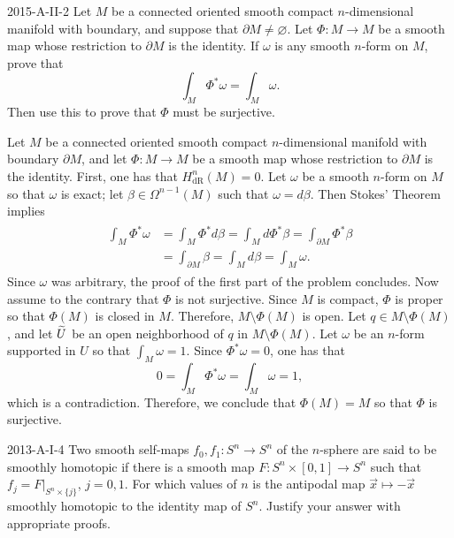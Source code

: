 \documentclass{article}
\begin{document}
	\begin{prb}{2015-A-II-2}
		Let $M$ be a connected oriented smooth compact $n$-dimensional manifold with boundary, and suppose that $\partial M \neq \varnothing$. Let $\Phi: M \to M$ be a smooth map whose restriction to $\partial M$ is the identity. If $\omega$ is any smooth $n$-form on $M$, prove that 
		\begin{equation*}
			\int_{M}\Phi^{\ast}\omega = \int_{M}\omega. 
		\end{equation*}
		Then use this to prove that $\Phi$ must be surjective. 
	\end{prb}
	Let $M$ be a connected oriented smooth compact $n$-dimensional manifold with boundary $\partial M$, and let $\Phi: M \to M$ be a smooth map whose restriction to $\partial M$ is the identity. First, one has that $H^{n}_{\text{dR}}(M)= 0$. Let $\omega$ be a smooth $n$-form on $M$ so that $\omega$ is exact; let $\beta \in \Omega^{n - 1}(M)$ such that $\omega = d\beta$. Then Stokes' Theorem implies 
	\begin{align*}
		\begin{split}
			\int_{M}\Phi^{\ast}\omega &= \int_{M}\Phi^{\ast}d\beta = \int_{M}d\Phi^{\ast}\beta = \int_{\partial M}\Phi^{\ast}\beta \\
			&= \int_{\partial M}\beta = \int_{M}d\beta = \int_{M}\omega. 
		\end{split}
	\end{align*}
	Since $\omega$ was arbitrary, the proof of the first part of the problem concludes. Now assume to the contrary that $\Phi$ is not surjective. Since $M$ is compact, $\Phi$ is proper so that $\Phi(M)$ is closed in $M$. Therefore, $M\setminus \Phi(M)$ is open. Let $q \in M\setminus \Phi(M)$, and let $\widetilde{U}$ be an open neighborhood of $q$ in $M \setminus \Phi(M)$. Let $\omega$ be an $n$-form supported in $U$ so that $\int_{M} \omega = 1$. Since $\Phi^{\ast}\omega = 0$, one has that 
	\begin{equation*}
		0 = \int_{M}\Phi^{\ast}\omega = \int_{M}\omega = 1, 
	\end{equation*}
	which is a contradiction. Therefore, we conclude that $\Phi(M) = M$ so that $\Phi$ is surjective. 
	\begin{prb}{2013-A-I-4}
		Two smooth self-maps $f_{0}, f_{1}: S^{n} \to S^{n}$ of the $n$-sphere are said to be smoothly homotopic if there is a smooth map $F: S^{n} \times [0,1] \to S^{n}$ such that $f_{j} = F|_{S^{n}\times \{j\}}$, $j =0, 1$. For which values of $n$ is the antipodal map $\vec{x} \mapsto - \vec{x}$ smoothly homotopic to the identity map of $S^{n}$. Justify your answer with appropriate proofs. 
	\end{prb}
\end{document}
